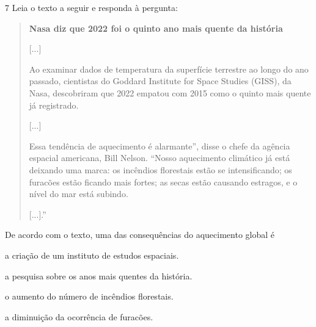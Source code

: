 \num{7} Leia o texto a seguir e responda à pergunta:

\begin{quote}
\textbf{Nasa diz que 2022 foi o quinto ano mais quente da história}

{[}...{]}

Ao examinar dados de temperatura da superfície terrestre ao longo do ano
passado, cientistas do Goddard Institute for Space Studies (GISS), da
Nasa, descobriram que 2022 empatou com 2015 como o quinto mais quente já
registrado.

{[}...{]}

Essa tendência de aquecimento é alarmante'', disse o chefe da agência
espacial americana, Bill Nelson. ``Nosso aquecimento climático já está
deixando uma marca: os incêndios florestais estão se intensificando; os
furacões estão ficando mais fortes; as secas estão causando estragos, e
o nível do mar está subindo.

{[}...{]}.''

\end{quote}

De acordo com o texto, uma das consequências do aquecimento global é

\begin{escolha}
\item a criação de um instituto de estudos espaciais.

\item a pesquisa sobre os anos mais quentes da história.

\item o aumento do número de incêndios florestais.

\item a diminuição da ocorrência de furacões.
\end{escolha}

